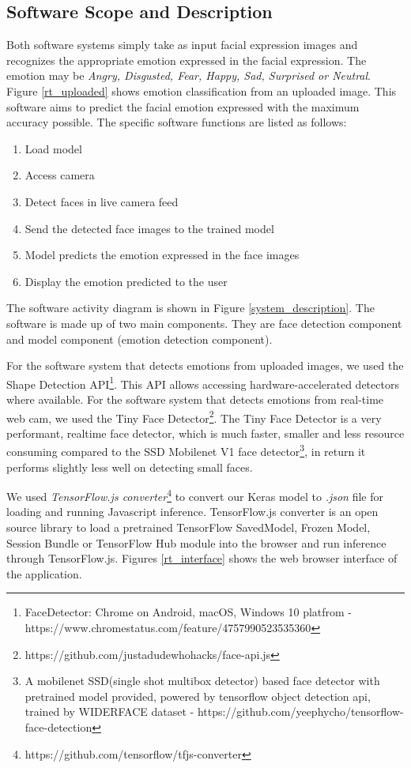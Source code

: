\documentclass[master]{thesis-uestc}
\begin{document}
\subsection*{Software Scope and Description}
Both software systems simply take as input facial expression images and recognizes the appropriate emotion expressed in the facial expression. The emotion may be \textit{Angry, Disgusted, Fear, Happy, Sad,
Surprised or Neutral}. Figure \ref{rt_uploaded} shows emotion classification from an uploaded image. This software aims to predict the facial emotion expressed with the maximum accuracy possible. The specific software functions are listed as follows:
\begin{enumerate}
    \item Load model
    \item Access camera
    \item Detect faces in live camera feed
    \item Send the detected face images to the trained model
    \item Model predicts the emotion expressed in the face images
    \item Display the emotion predicted to the user
\end{enumerate}
The software activity diagram is shown in Figure \ref{system_description}. The software is made up of two main components. They are face detection component and model component (emotion detection component).

For the software system that detects emotions from uploaded images, we used the Shape Detection API\footnote{FaceDetector: Chrome on Android, macOS, Windows 10 platfrom - https://www.chromestatus.com/feature/4757990523535360}. This API allows accessing hardware-accelerated detectors where available. For the software system that detects emotions from real-time web cam, we used the Tiny Face Detector\footnote{https://github.com/justadudewhohacks/face-api.js}. The Tiny Face Detector is a very performant, realtime face detector, which is much faster, smaller and less resource consuming compared to the SSD Mobilenet V1 face detector\footnote{A mobilenet SSD(single shot multibox detector) based face detector with pretrained model provided, powered by tensorflow object detection api, trained by WIDERFACE dataset - https://github.com/yeephycho/tensorflow-face-detection}, in return it performs slightly less well on detecting small faces.

We used \textit{TensorFlow.js converter}\footnote{https://github.com/tensorflow/tfjs-converter} to convert our Keras model to \textit{.json} file for loading and running Javascript inference. TensorFlow.js converter is an open source library to load a pretrained TensorFlow SavedModel, Frozen Model, Session Bundle or TensorFlow Hub module into the browser and run inference through TensorFlow.js. Figures \ref{rt_interface} shows the web browser interface of the application.
\end{document}
